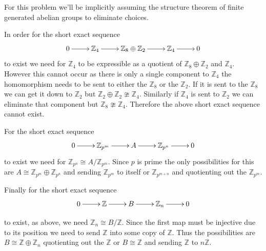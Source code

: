 \documentclass[10pt]{article}
\newcommand{\sk}{\vskip 10mm}
\newcommand{\bb}[1]{\mathbb{#1}}
\theoremstyle{plain}
\theoremstyle{remark}
\begin{document}
For this problem we'll be implicitly assuming the structure theorem of finite
generated abelian groups to eliminate choices.


In order for the short exact sequence
\[
  \xymatrix{0 \ar[r] & \bb{Z}_4 \ar[r] & \bb{Z}_8\oplus \bb{Z}_2\ar[r] &\bb{Z}_4 \ar[r] & 0}
\]
to exist we need for $\bb{Z}_4$ to be expressible as a quotient of
$\bb{Z}_8\oplus \bb{Z}_2$ and $\bb{Z}_4$. However this cannot occur as there is only
a single component to $\bb{Z}_4$ the homomorphism needs to be sent to either
the $\bb{Z}_8$ or the $\bb{Z}_2$. If it is sent to the $\bb{Z}_8$ we can get it
down to $\bb{Z}_2$ but $\bb{Z}_2\oplus\bb{Z}_2\ncong \bb{Z}_4$. Similarly if
$\bb{Z}_4$ is sent to $\bb{Z}_2$ we can eliminate that component but
$\bb{Z}_8\ncong \bb{Z}_4$. Therefore the above short exact sequence cannot
exist.

For the short exact sequence
\[
  \xymatrix{0 \ar[r] & \bb{Z}_{p^m} \ar[r] & A \ar[r] & \bb{Z}_{p^n}\ar[r] & 0}
\]
to exist we need for $\bb{Z}_{p^n}\cong A/\bb{Z}_{p^m}$. Since $p$ is prime the
only possibilities for this are $A\cong \bb{Z}_{p^m}\oplus\bb{Z}_{p^n}$ and sending
$\bb{Z}_{p^m}$ to itself or $\bb{Z}_{p^{m+n}}$ and quotienting out the $\bb{Z}_{p^m}$.


Finally for the short exact sequence
\[
  \xymatrix{0 \ar[r] & \bb{Z} \ar[r] & B \ar[r] & \bb{Z}_n\ar[r] & 0}
\]

to exist, as above, we need $\bb{Z}_n\cong B/\bb{Z}$. Since the first map
must be injective due to its position we need to send $\bb{Z}$ into
some copy of $\bb{Z}$. Thus the possibilities are $B\cong \bb{Z}\oplus\bb{Z}_n$
quotienting out the $\bb{Z}$ or $B\cong\bb{Z}$ and sending $\bb{Z}$ to $n\bb{Z}$.

\sk

\end{document}
